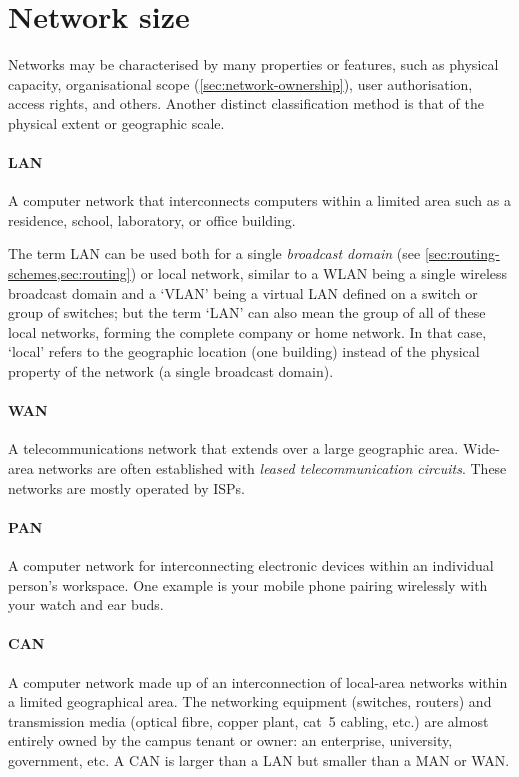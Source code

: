 {\section{Network size}
\label{sec:network-size}

Networks may be characterised by many properties or features, such as physical capacity, organisational scope (\vref{sec:network-ownership}), user authorisation, access rights, and others.
Another distinct classification method is that of the physical extent or geographic scale.

\paragraph{\gls{LAN}}
A computer network that interconnects computers within a limited area such as a residence, school, laboratory, or office building.

The term \gls{LAN} can be used both for a single \emph{broadcast domain} (see \vref{sec:routing-schemes,sec:routing}) or local network, similar to a \acs{WLAN} being a single wireless broadcast domain and a `\acs{VLAN}' being a virtual \gls{LAN} defined on a switch or group of switches; but the term `\gls{LAN}' can also mean the group of all of these local networks, forming the complete company or home network.
In that case, `local' refers to the geographic location (one building) instead of the physical property of the network (a single broadcast domain).

\paragraph{\gls{WAN}}
A telecommunications network that extends over a large geographic area.
Wide-area networks are often established with \emph{leased telecommunication circuits}.
These networks are mostly operated by \glspl{ISP}.

\paragraph{\gls{PAN}}
A computer network for interconnecting electronic devices within an individual person's workspace.
One example is your mobile phone pairing wirelessly with your watch and ear buds.

\paragraph{\gls{CAN}}
A computer network made up of an interconnection of local-area networks within a limited geographical area.
The networking equipment (switches, routers) and transmission media (optical fibre, copper plant, cat~5 cabling, etc.) are almost entirely owned by the campus tenant or owner: an enterprise, university, government, etc.
A \acl{CAN} is larger than a \acl{LAN} but smaller than a \acs{MAN} or \gls{WAN}.

}
